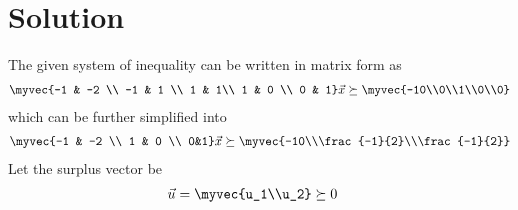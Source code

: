 \documentclass[journal,12pt,twocolumn]{IEEEtran}
\begin{document}
\section{Solution}
The given system of inequality can be written in matrix form as
\begin{align}
    \myvec{-1 & -2  \\ -1 & 1 \\ 1 & 1\\ 1 & 0 \\ 0 & 1}\vec{x} \succeq \myvec{-10\\0\\1\\0\\0}
\end{align}
which can be further simplified into 
\begin{align}
    \myvec{-1 & -2 \\ 1 & 0 \\ 0&1}\vec{x} \succeq \myvec{-10\\\frac{-1}{2}\\\frac{-1}{2}}
\end{align}
Let the surplus vector be
\begin{align}
    \vec{u} &= \myvec{u_1\\u_2} \succeq 0
\end{align}
\end{document}
